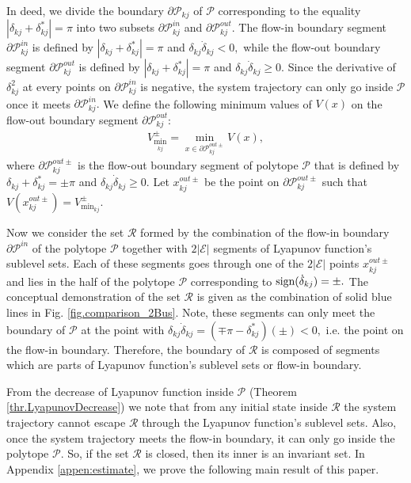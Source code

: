 \documentclass[final]{IEEEtran}
\begin{document}
In deed, we divide the
boundary $\partial\mathcal{P}_{kj}$ of $\mathcal{P}$ corresponding to the
equality $|\delta_{kj}+\delta_{kj}^*|=\pi$ into two
subsets $\partial\mathcal{P}_{kj}^{in}$ and
$\partial\mathcal{P}_{kj}^{out}$. The flow-in boundary
segment $\partial\mathcal{P}_{kj}^{in}$ is defined by
$|\delta_{kj}+\delta_{kj}^*|=\pi$ and
$\delta_{kj}\dot{\delta}_{kj} < 0,$ while the flow-out boundary
segment $\partial\mathcal{P}_{kj}^{out}$ is defined by
$|\delta_{kj}+\delta_{kj}^*|=\pi$ and
$\delta_{kj}\dot{\delta}_{kj} \ge 0.$ Since the derivative of $\delta_{kj}^2$ at every points on
$\partial\mathcal{P}_{kj}^{in}$ is negative, the system trajectory can only go inside $\mathcal{P}$ once it meets $\partial\mathcal{P}_{kj}^{in}.$
We define the following minimum values of $V(x)$ on the flow-out boundary segment
$\partial\mathcal{P}_{kj}^{out}$:
\begin{align}\label{eq.Vmin1}
 V^{\pm}_{\min_{kj}}=\mathop {\min}\limits_{x \in \partial\mathcal{P}_{kj}^{out\pm}} V(x),
\end{align}
where $\partial\mathcal{P}_{kj}^{out\pm}$ is the flow-out boundary
segment of polytope $\mathcal{P}$ that is defined by $\delta_{kj}
+\delta_{kj}^* = \pm\pi$ and $\delta_{kj}\dot{\delta}_{kj} \ge 0$.
Let $x_{kj}^{out\pm}$ be the point on $\partial\mathcal{P}_{kj}^{out\pm}$ such that
$V(x_{kj}^{out\pm})=V^{\pm}_{\min_{kj}}.$ 

Now we consider the set $\mathcal{R}$ formed by the combination of the flow-in boundary $\partial\mathcal{P}^{in}$ of the polytope $\mathcal{P}$
together with $2|\mathcal{E}|$ segments of Lyapunov function's sublevel sets. Each of these segments goes through one of the $2|\mathcal{E}|$  points $x_{kj}^{out\pm}$
and lies in the half of the polytope $\mathcal{P}$ corresponding to $\emph{\emph{sign}}(\dot{\delta}_{kj})=\pm.$ The conceptual demonstration of the set $\mathcal{R}$ is given as
the combination of solid blue lines
in Fig. \ref{fig.comparison_2Bus}. Note, these segments 
can only meet the boundary of $\mathcal{P}$ at the point with $\delta_{kj}\dot{\delta}_{kj}=(\mp \pi- \delta_{kj}^*)(\pm)<0,$ i.e. the point on the flow-in boundary. Therefore, the boundary of $\mathcal{R}$ is composed of segments which are parts of Lyapunov function's sublevel sets or flow-in boundary. 

From the decrease of Lyapunov function inside $\mathcal{P}$ (Theorem \ref{thr.LyapunovDecrease}) we note that from any initial state inside $\mathcal{R}$ the system trajectory cannot escape $\mathcal{R}$ through the Lyapunov function's sublevel sets. Also, once the system trajectory meets the flow-in boundary, it can only go inside the polytope $\mathcal{P}.$ So, if the set $\mathcal{R}$ is closed, then its inner is an invariant set.   
In Appendix \ref{appen:estimate}, we prove the following main result of this paper.
\end{document}
